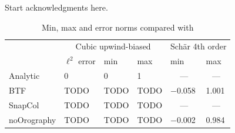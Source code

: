 \documentclass[twocol]{ametsoc}
\begin{document}
\acknowledgments
Start acknowledgments here.






\begin{table}[t]
\caption{Min, max and error norms compared with \citet{schaer2002}}
\label{tab:advection}
%
\begin{center}
\begin{tabular}{ l l l l l l }
\hline\hline
& \multicolumn{3}{c}{Cubic upwind-biased} & \multicolumn{2}{c}{Sch\"ar 4th order} \\
& $\ell^2$ error & min & max & min & max \\
\hline
Analytic  & 0 & 0 & 1 & \multicolumn{1}{c}{---} & \multicolumn{1}{c}{---} \\
BTF 	  & TODO & TODO & TODO & \num{-0.058} & \num{1.001} \\
SnapCol   & TODO & TODO & TODO & \multicolumn{1}{c}{---} & \multicolumn{1}{c}{---} \\
noOrography & TODO & TODO & TODO & \num{-0.002} & \num{0.984} \\
\hline
\end{tabular}
\end{center}
\end{table}

\end{document}
